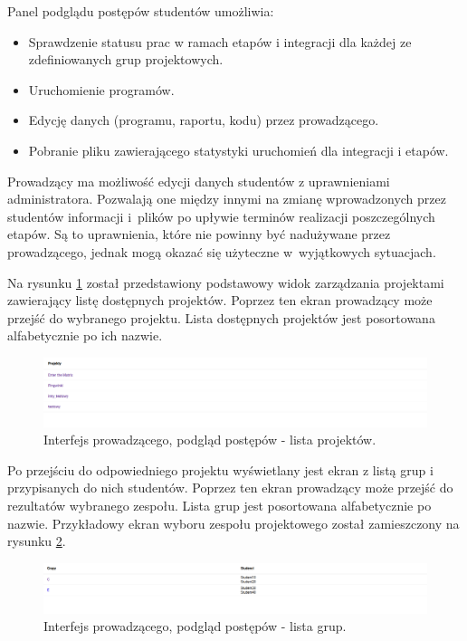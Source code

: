 Panel podglądu postępów studentów umożliwia:
\begin {itemize}
    \item Sprawdzenie statusu prac w ramach etapów i integracji dla każdej ze zdefiniowanych grup projektowych.
    \item Uruchomienie programów.
    \item Edycję danych (programu, raportu, kodu) przez prowadzącego.
    \item Pobranie pliku zawierającego statystyki uruchomień dla integracji i etapów.
\end {itemize}

Prowadzący ma możliwość edycji danych studentów z uprawnieniami administratora.
Pozwalają one między innymi na zmianę wprowadzonych przez studentów informacji i~plików po upływie terminów realizacji poszczególnych etapów.
Są to uprawnienia, które nie powinny być nadużywane przez prowadzącego, jednak mogą okazać się użyteczne w~wyjątkowych sytuacjach.

Na rysunku \ref{fig:lecturer_preview_projects_list} został przedstawiony podstawowy widok zarządzania projektami zawierający listę dostępnych projektów.
Poprzez ten ekran prowadzący może przejść do wybranego projektu.
Lista dostępnych projektów jest posortowana alfabetycznie po ich nazwie.

\begin{figure}[h]
    \centering
    \includegraphics[width = 15cm]{chapter04/lecturer_preview_projects_list.png}
    \caption{Interfejs prowadzącego, podgląd postępów - lista projektów.}
    \label{fig:lecturer_preview_projects_list}
\end{figure}

Po przejściu do odpowiedniego projektu wyświetlany jest ekran z listą grup i przypisanych do nich studentów.
Poprzez ten ekran prowadzący może przejść do rezultatów wybranego zespołu.
Lista grup jest posortowana alfabetycznie po nazwie.
Przykładowy ekran wyboru zespołu projektowego został zamieszczony na rysunku \ref{fig:lecturer_preview_groups}.

\begin{figure}[h]
    \centering
    \includegraphics[width = 15cm]{chapter04/lecturer_preview_groups.png}
    \caption{Interfejs prowadzącego, podgląd postępów - lista grup.}
    \label{fig:lecturer_preview_groups}
\end{figure}

